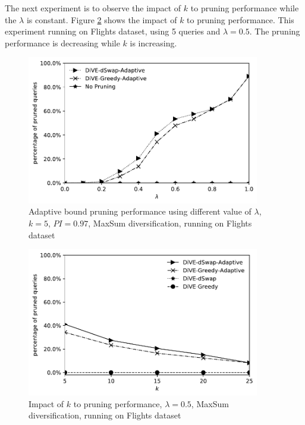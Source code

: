 \documentclass{article}
\begin{document}
The next experiment is to observe the impact of $k$ to pruning performance while the $\lambda$ is constant. Figure \ref{fig:impact-of-k-pruning-performance} shows the impact of $k$ to pruning performance. This experiment running on Flights dataset, using 5 queries and $\lambda = 0.5$. The pruning performance is decreasing while $k$ is increasing. 

\begin{figure}
	\begin{center}
		\includegraphics[width=4.0in]{figures/pruning_performance_greedy_dswap_adaptive}
		\vspace{-12pt}
		\caption{Adaptive bound pruning performance using different value of $ \lambda $, $k = 5$,  $ PI = 0.97 $, MaxSum diversification, running on Flights dataset}
		\label{fig:adaptive-pruning-performance}

	\end{center}
\end{figure}

\begin{figure}
	\begin{center}
		\includegraphics[width=4.0in]{figures/impact_of_k_to_pruning_adaptive}
		\vspace{-12pt}
		\caption{Impact of $k$ to pruning performance, $\lambda = 0.5$, MaxSum diversification, running on Flights dataset}
		\label{fig:impact-of-k-pruning-performance}
		
	\end{center}
\end{figure}
\end{document}
